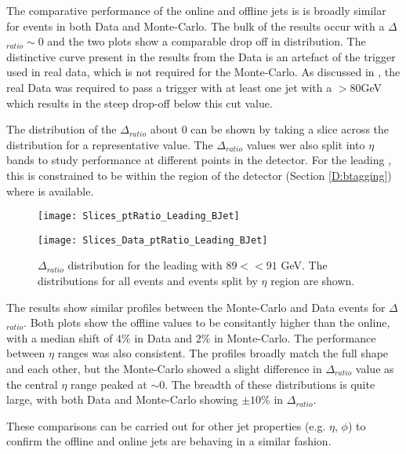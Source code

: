 		The comparative performance of the online and offline jets is \pt is broadly similar for events in both Data and Monte-Carlo. The bulk of the results occur with a $\Delta$\pt$_{ratio}\sim0$ and the two plots show a comparable drop off in \pt distribution. The distinctive curve present in the results from the Data is an artefact of the trigger used in real data, which is not required for the Monte-Carlo. As discussed in , the real Data was required to pass a trigger with at least one jet with a \pt$>80$GeV which results in the steep drop-off below this cut value. 
		
		The distribution of the $\Delta$\pt$_{ratio}$ about 0 can be shown by taking a slice across the distribution for a representative \pt value. The $\Delta $\pt$_{ratio}$ values wer also split into $\eta$ bands to study performance at different points in the detector. For the leading \bjet, this is constrained to be within the region of the detector (Section \ref{D:btagging}) where \btagging is available.   
		
		\begin{figure}[h]
			\centering

			\begin{minipage}[h]{0.33\linewidth}
				\texttt{[image: Slices\_ptRatio\_Leading\_BJet]}
			\end{minipage}
			\quad
			\begin{minipage}[h]{0.33\linewidth}
				\texttt{[image: Slices\_Data\_ptRatio\_Leading\_BJet]}
			\end{minipage}
			\caption{$\Delta $\pt$_{ratio}$ distribution for the leading \bjet with $89<$\pt$<91$ GeV. The distributions for all events and events split by $\eta$ region are shown.}
			\label{fig:O:leadingbptslice}
		\end{figure}
		
		 The results show similar profiles between the Monte-Carlo and Data events for $\Delta$\pt$_{ratio}$. Both plots show the offline \pt values to be consitantly higher than the online, with a median shift of $4\%$ in Data and $2\%$ in Monte-Carlo. The performance between $\eta$ ranges was also consistent. The profiles broadly match the full shape and each other, but the Monte-Carlo showed a slight difference in  $\Delta$\pt$_{ratio}$ value as the central $\eta$ range peaked at $\sim0$. The breadth of these distributions is quite large, with both Data and Monte-Carlo showing $\pm10\%$ in $\Delta$\pt$_{ratio}$.
		
		These comparisons can be carried out for other jet properties (e.g. $\eta$, $\phi$) to confirm the offline and online jets are behaving in a similar fashion.
		
